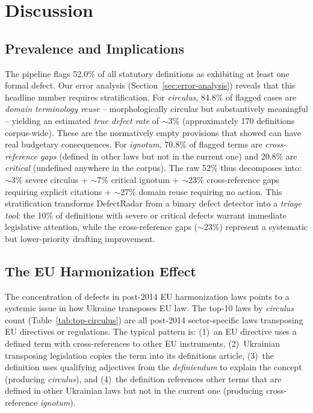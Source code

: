 \documentclass[11pt]{article}
\begin{document}
\section{Discussion}
\label{sec:discussion}

\subsection{Prevalence and Implications}

The pipeline flags 52.0\% of all statutory definitions as exhibiting at least one formal defect.
Our error analysis (Section~\ref{sec:error-analysis}) reveals that this headline number requires stratification.
For \emph{circulus}, 84.8\% of flagged cases are \emph{domain terminology reuse} -- morphologically circular but substantively meaningful -- yielding an estimated \emph{true defect rate} of $\sim$3\% (approximately 170 definitions corpus-wide).
These are the normatively empty provisions that \citet{kyrychenko2026creative} showed can have real budgetary consequences.
For \emph{ignotum}, 70.8\% of flagged terms are \emph{cross-reference gaps} (defined in other laws but not in the current one) and 20.8\% are \emph{critical} (undefined anywhere in the corpus).
The raw 52\% thus decomposes into: $\sim$3\% severe circulus + $\sim$7\% critical ignotum + $\sim$23\% cross-reference gaps requiring explicit citations + $\sim$27\% domain reuse requiring no action.
This stratification transforms DefectRadar from a binary defect detector into a \emph{triage tool}: the 10\% of definitions with severe or critical defects warrant immediate legislative attention, while the cross-reference gaps ($\sim$23\%) represent a systematic but lower-priority drafting improvement.

\subsection{The EU Harmonization Effect}

The concentration of defects in post-2014 EU harmonization laws points to a systemic issue in how Ukraine transposes EU law.
The top-10 laws by \emph{circulus} count (Table~\ref{tab:top-circulus}) are all post-2014 sector-specific laws transposing EU directives or regulations.
The typical pattern is: (1)~an EU directive uses a defined term with cross-references to other EU instruments, (2)~Ukrainian transposing legislation copies the term into its definitions article, (3)~the definition uses qualifying adjectives from the \emph{definiendum} to explain the concept (producing \emph{circulus}), and (4)~the definition references other terms that are defined in other Ukrainian laws but not in the current one (producing cross-reference \emph{ignotum}).
\end{document}
